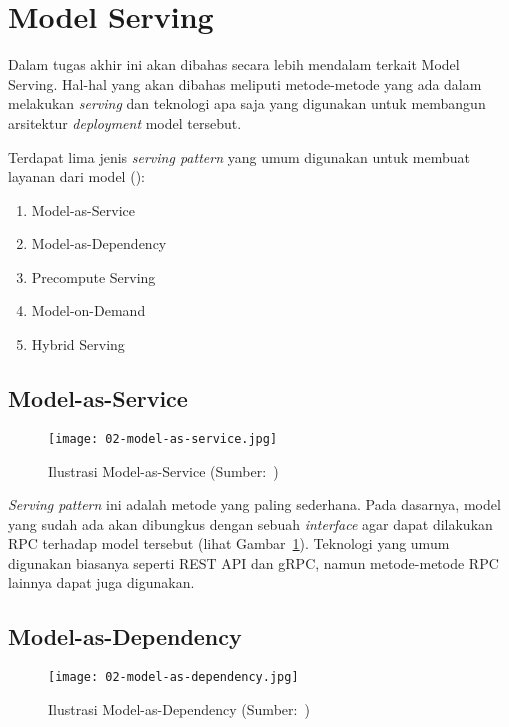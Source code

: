 \section{Model Serving}\label{chap:model-serving}

Dalam tugas akhir ini akan dibahas secara lebih mendalam terkait Model Serving.
Hal-hal yang akan dibahas meliputi metode-metode yang ada dalam melakukan \textit{serving} dan teknologi apa saja yang digunakan untuk membangun arsitektur \textit{deployment} model tersebut.

Terdapat lima jenis \textit{serving pattern} yang umum digunakan untuk membuat layanan dari model (\cite{mlopsorg}):
\begin{enumerate}
  \item Model-as-Service
  \item Model-as-Dependency
  \item Precompute Serving
  \item Model-on-Demand
  \item Hybrid Serving
\end{enumerate}

\subsection{Model-as-Service}

\begin{figure}[ht]
  \centering
  \texttt{[image: 02-model-as-service.jpg]}
  \caption{Ilustrasi Model-as-Service (Sumber:~\cite{book-handsonml})}\label{fig:model-as-service}
\end{figure}

\textit{Serving pattern} ini adalah metode yang paling sederhana.
Pada dasarnya, model yang sudah ada akan dibungkus dengan sebuah \textit{interface} agar dapat dilakukan RPC terhadap model tersebut (lihat Gambar~\ref{fig:model-as-service}).
Teknologi yang umum digunakan biasanya seperti REST API dan gRPC, namun metode-metode RPC lainnya dapat juga digunakan.

\subsection{Model-as-Dependency}

\begin{figure}[ht]
  \centering
  \texttt{[image: 02-model-as-dependency.jpg]}
  \caption{Ilustrasi Model-as-Dependency (Sumber:~\cite{book-handsonml})}\label{fig:model-as-dependency}
\end{figure}

